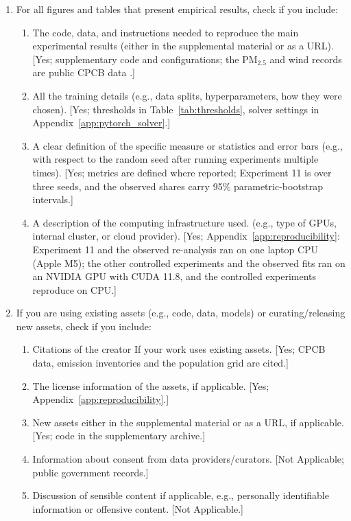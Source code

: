 \begin{enumerate}
  \item For all figures and tables that present empirical results, check if you
  include:
  \begin{enumerate}
    \item The code, data, and instructions needed to reproduce the main experimental
    results (either in the supplemental material or as a URL). [Yes; supplementary
    code and configurations; the PM\(_{2.5}\) and wind records are public CPCB data
    \citep{cpcb,cpcb_portal}.]
    \item All the training details (e.g., data splits, hyperparameters, how they were
    chosen). [Yes; thresholds in Table~\ref{tab:thresholds}, solver settings in
    Appendix~\ref{app:pytorch_solver}.]
    \item A clear definition of the specific measure or statistics and error bars
    (e.g., with respect to the random seed after running experiments multiple times).
    [Yes; metrics are defined where reported; Experiment 11 is over three seeds, and
    the observed shares carry 95\% parametric-bootstrap intervals.]
    \item A description of the computing infrastructure used. (e.g., type of GPUs,
    internal cluster, or cloud provider). [Yes; Appendix~\ref{app:reproducibility}: Experiment 11 and the observed
    re-analysis ran on one laptop CPU (Apple M5); the other controlled
    experiments and the observed fits ran on an NVIDIA GPU with CUDA 11.8, and the
    controlled experiments reproduce on CPU.]
  \end{enumerate}

  \item If you are using existing assets (e.g., code, data, models) or
  curating/releasing new assets, check if you include:
  \begin{enumerate}
    \item Citations of the creator If your work uses existing assets. [Yes; CPCB data,
    emission inventories and the population grid are cited.]
    \item The license information of the assets, if applicable. [Yes;
    Appendix~\ref{app:reproducibility}.]
    \item New assets either in the supplemental material or as a URL, if applicable.
    [Yes; code in the supplementary archive.]
    \item Information about consent from data providers/curators. [Not Applicable;
    public government records.]
    \item Discussion of sensible content if applicable, e.g., personally identifiable
    information or offensive content. [Not Applicable.]
  \end{enumerate}


\end{enumerate}
